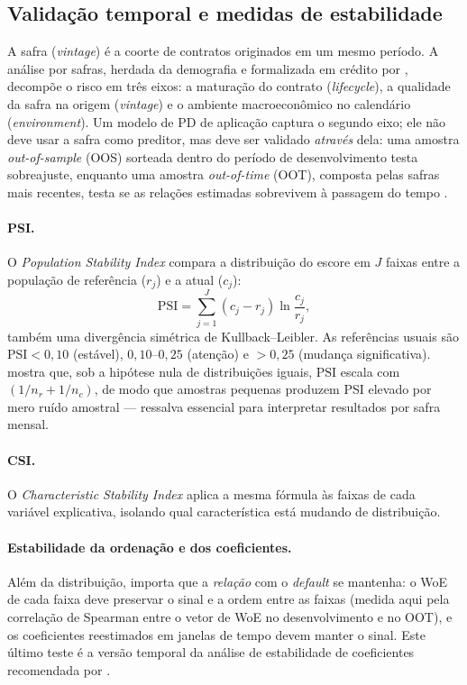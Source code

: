 \documentclass[11pt,a4paper]{article}
\newcommand{\psiidx}{\mathrm{PSI}}
\begin{document}
\subsection{Validação temporal e medidas de estabilidade}
\label{sec:estabilidade}

A safra (\emph{vintage}) é a coorte de contratos originados em um mesmo período. A análise por safras, herdada da demografia \citep{glenn1977} e formalizada em crédito por \citet{breeden2016}, decompõe o risco em três eixos: a maturação do contrato (\emph{lifecycle}), a qualidade da safra na origem (\emph{vintage}) e o ambiente macroeconômico no calendário (\emph{environment}). Um modelo de PD de aplicação captura o segundo eixo; ele não deve usar a safra como preditor, mas deve ser validado \emph{através} dela: uma amostra \emph{out-of-sample} (OOS) sorteada dentro do período de desenvolvimento testa sobreajuste, enquanto uma amostra \emph{out-of-time} (OOT), composta pelas safras mais recentes, testa se as relações estimadas sobrevivem à passagem do tempo \citep{bcbs2005,sr117}.

\paragraph{PSI.} O \emph{Population Stability Index} compara a distribuição do escore em $J$ faixas entre a população de referência ($r_j$) e a atual ($c_j$):
\begin{equation}
\psiidx=\sum_{j=1}^{J}(c_j-r_j)\ln\frac{c_j}{r_j},
\label{eq:psi}
\end{equation}
também uma divergência simétrica de Kullback--Leibler. As referências usuais são $\psiidx<0{,}10$ (estável), $0{,}10$--$0{,}25$ (atenção) e $>0{,}25$ (mudança significativa). \citet{yurdakul2018} mostra que, sob a hipótese nula de distribuições iguais, $\psiidx$ escala com $(1/n_r+1/n_c)$, de modo que amostras pequenas produzem PSI elevado por mero ruído amostral --- ressalva essencial para interpretar resultados por safra mensal.

\paragraph{CSI.} O \emph{Characteristic Stability Index} aplica a mesma fórmula às faixas de cada variável explicativa, isolando qual característica está mudando de distribuição.

\paragraph{Estabilidade da ordenação e dos coeficientes.} Além da distribuição, importa que a \emph{relação} com o \emph{default} se mantenha: o WoE de cada faixa deve preservar o sinal e a ordem entre as faixas (medida aqui pela correlação de Spearman entre o vetor de WoE no desenvolvimento e no OOT), e os coeficientes reestimados em janelas de tempo devem manter o sinal. Este último teste é a versão temporal da análise de estabilidade de coeficientes recomendada por \citet{bcbs2005}.
\end{document}
